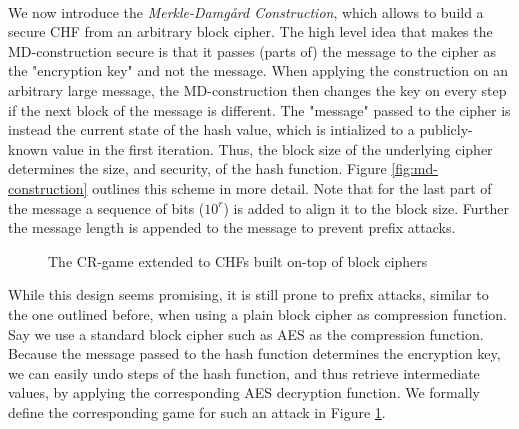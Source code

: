 \paragraph{}
We now introduce the \emph{Merkle-Damg\aa rd Construction}, which allows to build a secure CHF from an arbitrary block cipher.
The high level idea that makes the MD-construction secure is that it passes (parts of) the message to the cipher as the "encryption key" and not the message.
When applying the construction on an arbitrary large message, the MD-construction then changes the key on every step if the next block of the message is different.
The "message" passed to the cipher is instead the current state of the hash value, which is intialized to a publicly-known value in the first iteration.
Thus, the block size of the underlying cipher determines the size, and security, of the hash function.
Figure \ref{fig:md-construction} outlines this scheme in more detail. Note that for the last part of the message a sequence of bits ($10^r$) is added to align it to the block size. Further the message length is appended to the message to prevent prefix attacks.

\begin{figure}
\centering

    \caption{The CR-game extended to CHFs built on-top of block ciphers}
    \label{fig:cr-game-bc}
\end{figure}


While this design seems promising, it is still prone to prefix attacks, similar to the one outlined before, when using a plain block cipher as compression function.
Say we use a standard block cipher such as AES as the compression function. Because the message passed to the hash function determines the encryption key, we can easily undo steps of the hash function, and thus retrieve intermediate values, by applying the corresponding AES decryption function.
We formally define the corresponding game for such an attack in Figure \ref{fig:cr-game-bc}.

